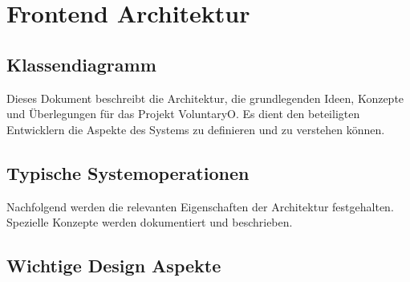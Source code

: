 \chapter{Frontend Architektur}
	\section{Klassendiagramm}
	Dieses Dokument beschreibt die Architektur, die grundlegenden Ideen, Konzepte und Überlegungen für das Projekt VoluntaryO. Es dient den beteiligten Entwicklern die Aspekte des Systems zu definieren und zu verstehen können.
	
	
	\section{Typische Systemoperationen}
	Nachfolgend werden die relevanten Eigenschaften der Architektur festgehalten. Spezielle Konzepte werden dokumentiert und beschrieben.

	\section{Wichtige Design Aspekte}